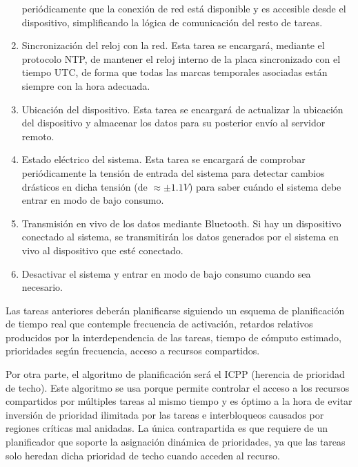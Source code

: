 \begin{enumerate}
        periódicamente que la conexión de red está disponible y es accesible desde
        el dispositivo, simplificando la lógica de comunicación del resto de tareas.
  \item Sincronización del reloj con la red. Esta tarea se encargará, mediante el
        protocolo \ac{NTP}, de mantener el reloj interno de la placa sincronizado con el
        tiempo \ac{UTC}, de forma que todas las marcas temporales asociadas están siempre
        con la hora adecuada.
  \item Ubicación del dispositivo. Esta tarea se encargará de actualizar la ubicación
        del dispositivo y almacenar los datos para su posterior envío al servidor remoto.
  \item Estado eléctrico del sistema. Esta tarea se encargará de comprobar periódicamente
        la tensión de entrada del sistema para detectar cambios drásticos en dicha
        tensión (de $\approx \pm 1.1V$) para saber cuándo el sistema debe entrar en
        modo de bajo consumo.
  \item Transmisión en vivo de los datos mediante Bluetooth. Si hay un dispositivo
        conectado al sistema, se transmitirán los datos generados por el sistema
        en vivo al dispositivo que esté conectado.
  \item Desactivar el sistema y entrar en modo de bajo consumo cuando sea necesario.
\end{enumerate}

Las tareas anteriores deberán planificarse siguiendo un esquema de planificación de
tiempo real que contemple frecuencia de activación, retardos relativos producidos
por la interdependencia de las tareas, tiempo de cómputo estimado, prioridades
según frecuencia, acceso a recursos compartidos.

Por otra parte, el algoritmo de planificación será el \ac{ICPP} (herencia de prioridad de techo).
Este algoritmo se usa porque permite controlar el acceso a los recursos compartidos
por múltiples tareas al mismo tiempo y es óptimo a la hora de evitar inversión
de prioridad ilimitada por las tareas e interbloqueos causados por regiones críticas
mal anidadas. La única contrapartida es que requiere de un planificador que soporte
la asignación dinámica de prioridades, ya que las tareas solo heredan dicha
prioridad de techo cuando acceden al recurso.
